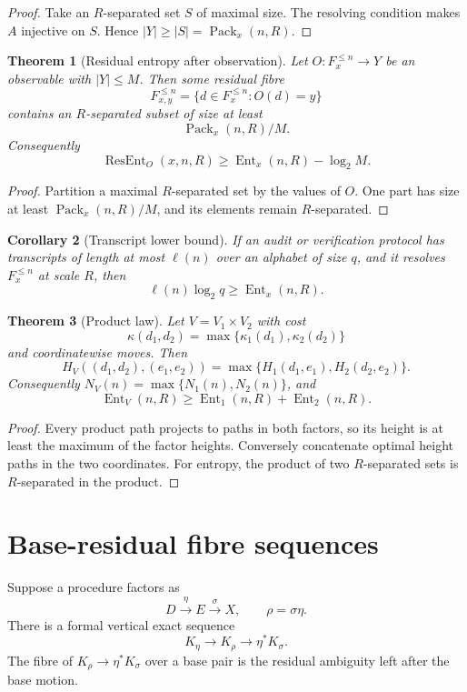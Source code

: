 \documentclass[11pt]{article}
\newtheorem{theorem}{Theorem}[section]
\newtheorem{corollary}[theorem]{Corollary}
\DeclareMathOperator{\Ent}{Ent}
\DeclareMathOperator{\Pack}{Pack}
\DeclareMathOperator{\ResEnt}{ResEnt}
\begin{document}
\begin{proof}
Take an \(R\)-separated set \(S\) of maximal size.  The resolving condition makes \(A\) injective on \(S\).  Hence \(|Y|\ge |S|=\Pack_x(n,R)\).
\end{proof}

\begin{theorem}[Residual entropy after observation]
Let \(O:F_x^{\le n}\to Y\) be an observable with \(|Y|\le M\).  Then some residual fibre
\[
F_{x,y}^{\le n}=\{d\in F_x^{\le n}:O(d)=y\}
\]
contains an \(R\)-separated subset of size at least
\[
\Pack_x(n,R)/M.
\]
Consequently
\[
\ResEnt_O(x,n,R)\ge \Ent_x(n,R)-\log_2M.
\]
\end{theorem}

\begin{proof}
Partition a maximal \(R\)-separated set by the values of \(O\).  One part has size at least \(\Pack_x(n,R)/M\), and its elements remain \(R\)-separated.
\end{proof}

\begin{corollary}[Transcript lower bound]
If an audit or verification protocol has transcripts of length at most \(\ell(n)\) over an alphabet of size \(q\), and it resolves \(F_x^{\le n}\) at scale \(R\), then
\[
\ell(n)\log_2q\ge\Ent_x(n,R).
\]
\end{corollary}

\begin{theorem}[Product law]
Let \(V=V_1\times V_2\) with cost
\[
\kappa(d_1,d_2)=\max\{\kappa_1(d_1),\kappa_2(d_2)\}
\]
and coordinatewise moves.  Then
\[
H_V((d_1,d_2),(e_1,e_2))
=\max\{H_1(d_1,e_1),H_2(d_2,e_2)\}.
\]
Consequently \(N_V(n)=\max\{N_1(n),N_2(n)\}\), and
\[
\Ent_V(n,R)\ge\Ent_1(n,R)+\Ent_2(n,R).
\]
\end{theorem}

\begin{proof}
Every product path projects to paths in both factors, so its height is at least the maximum of the factor heights.  Conversely concatenate optimal height paths in the two coordinates.  For entropy, the product of two \(R\)-separated sets is \(R\)-separated in the product.
\end{proof}

\section{Base-residual fibre sequences}

Suppose a procedure factors as
\[
D\xrightarrow{\eta}E\xrightarrow{\sigma}X,\qquad \rho=\sigma\eta.
\]
There is a formal vertical exact sequence
\[
K_\eta\longrightarrow K_\rho\longrightarrow \eta^*K_\sigma.
\]
The fibre of \(K_\rho\to\eta^*K_\sigma\) over a base pair is the residual ambiguity left after the base motion.
\end{document}
